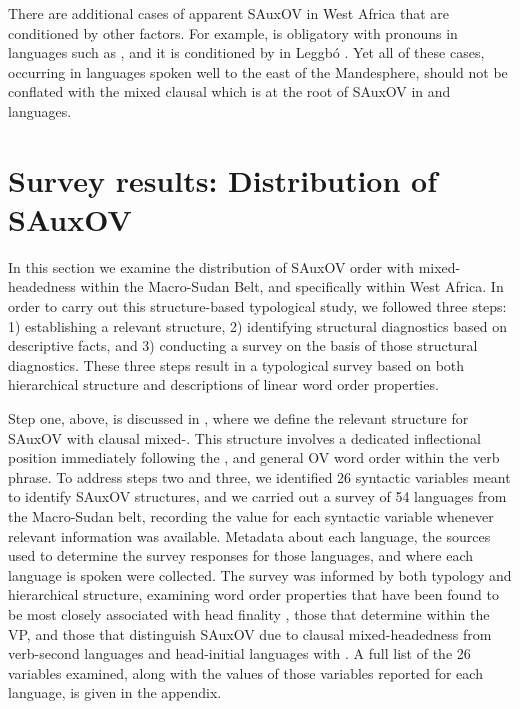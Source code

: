 \documentclass[output=paper,newtxmath,modfonts,nonflat,draftmode]{langsci/langscibook}
\begin{document}
There are additional cases of apparent SAuxOV in West Africa that are conditioned by other factors. For example,  is obligatory with pronouns in  languages such as  \citep{ikoro96}, and it is conditioned by  in Leggbó \citep{good07}. Yet all of these cases, occurring in languages spoken well to the east of the Mandesphere, should not be conflated with the mixed clausal  which is at the root of SAuxOV in  and  languages.


\section{Survey results: Distribution of SAuxOV}\label{sec:distribution}

In this section we examine the distribution of SAuxOV order with mixed-head\-ed\-ness within the Macro-Sudan Belt, and specifically within West Africa. In order to carry out this structure-based typological study, we followed three steps: 1) establishing a relevant structure, 2) identifying structural diagnostics based on descriptive facts, and 3) conducting a survey on the basis of those structural diagnostics. These three steps result in a typological survey based on both hierarchical structure and descriptions of linear word order properties. 

Step one, above, is discussed in , where we define the relevant structure for SAuxOV with clausal mixed-. This structure involves a dedicated inflectional position immediately following the , and general OV word order within the verb phrase. To address steps two and three, we identified 26 syntactic variables meant to identify SAuxOV structures, and we carried out a survey of 54 languages from the Macro-Sudan belt, recording the value for each syntactic variable whenever relevant information was available. Metadata about each language, the sources used to determine the survey responses for those languages, and where each language is spoken were collected. The survey was informed by both typology and hierarchical structure, examining word order properties that have been found to be most closely associated with head finality \citep{dryer92, dryer07}, those that determine  within the VP, and those that distinguish SAuxOV due to clausal mixed-head\-ed\-ness  from verb-second languages and head-initial languages with . A full list of the 26 variables examined, along with the values of those variables reported for each language, is given in the appendix.
\end{document}
